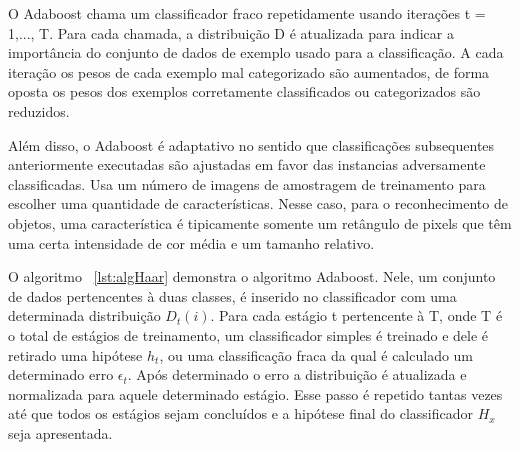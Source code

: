 O Adaboost chama um classificador fraco repetidamente usando iterações t = 1,..., T. Para cada chamada, a distribuição D é atualizada para indicar a importância do conjunto de dados de exemplo usado para a classificação. A cada iteração os pesos de cada exemplo mal categorizado são aumentados, de forma oposta os pesos dos exemplos corretamente classificados ou categorizados são reduzidos. \cite{SchapireGentle1}

Além disso, o Adaboost é adaptativo \cite{Adaboost} no sentido que classificações subsequentes anteriormente executadas são ajustadas em favor das instancias adversamente classificadas. Usa um número de imagens de amostragem de treinamento para escolher uma quantidade de características. Nesse caso, para o reconhecimento de objetos, uma característica é tipicamente somente um retângulo de pixels que têm uma certa intensidade de cor média e um tamanho relativo.

O algoritmo ~\ref{lst:algHaar} demonstra o algoritmo Adaboost. Nele, um conjunto de dados pertencentes à duas classes, é inserido no classificador com uma determinada distribuição \(D_{t}(i)\). Para cada estágio t pertencente à T, onde T é o total de estágios de treinamento, um classificador simples é treinado e dele é retirado uma hipótese \(h_{t}\), ou uma classificação fraca da qual é calculado um determinado erro \(\epsilon_{t}\). Após determinado o erro a distribuição é atualizada e normalizada para aquele determinado estágio. Esse passo é repetido tantas vezes até que todos os estágios sejam concluídos e a hipótese final do classificador \(H_{x}\) seja apresentada. 

